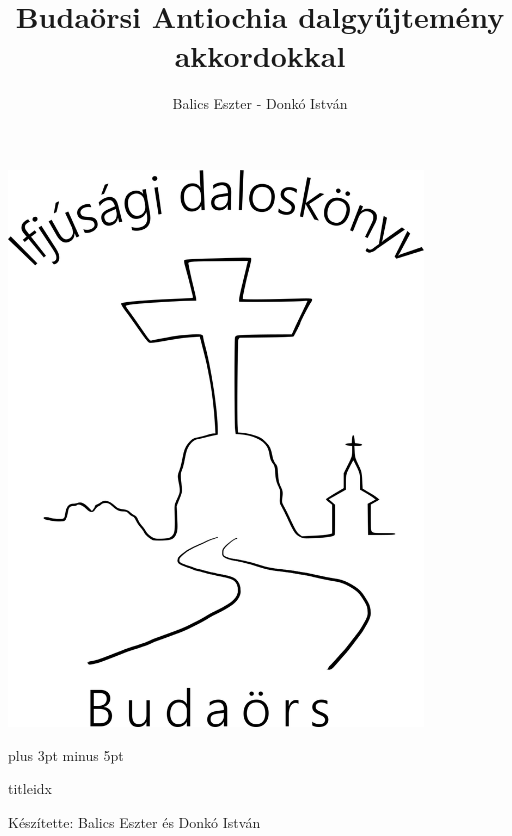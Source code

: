 \documentclass[a5paper,twoside]{article}
\title{Budaörsi Antiochia dalgyűjtemény akkordokkal}
\author{Balics Eszter - Donkó István}
\renewcommand{\_}[1]{\underline{#1}} %
\begin{document}
  \begin{titlepage}
    \setlength{\oddsidemargin}{-1.3cm}

    \vspace*{1.3cm}
    \includegraphics[width=11cm]{Logo_songbook}

    \thispagestyle{empty}
  \end{titlepage}

  \renewcommand{\idxtitlefont}{\sffamily}
  \renewcommand{\idxlyricfont}{\rmfamily\slshape}

  \versesep=12pt plus 3pt minus 5pt

  \begin{songs}{titleidx}
    
  \end{songs}

  \renewcommand{\thesongnum}{K\arabic{songnum}}
  \begin{songs}{}
    
  \end{songs}

  \renewcommand{\thesongnum}{M\arabic{songnum}}
  \setlength{\songnumwidth}{1.25cm}
  \begin{songs}{}
    
  \end{songs}

  \newpage
  \thispagestyle{empty}

  \vspace*{\fill}
  Készítette: Balics Eszter és Donkó István
\end{document}
